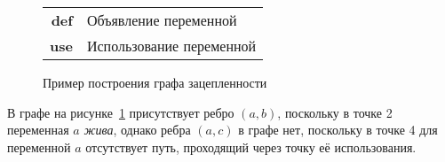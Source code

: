 \begin{example}
    \begin{figure}[h]
        \centering
    \caption{Пример построения графа зацепленности}
    \begin{tabular}{r @{: } l}
        \textbf{def} & Объявление переменной \\
        \textbf{use} & Использование переменной \\
    \end{tabular}
    \label{fig:ex1}
    \end{figure}

        


В графе на рисунке~\ref{fig:ex1} присутствует ребро $(a, b)$, поскольку в точке 2 переменная $a$ \textit{жива}, однако ребра $(a, c)$ в графе нет,
поскольку в точке 4 для переменной $a$ отсутствует путь, проходящий через точку её использования.
    
\end{example}

